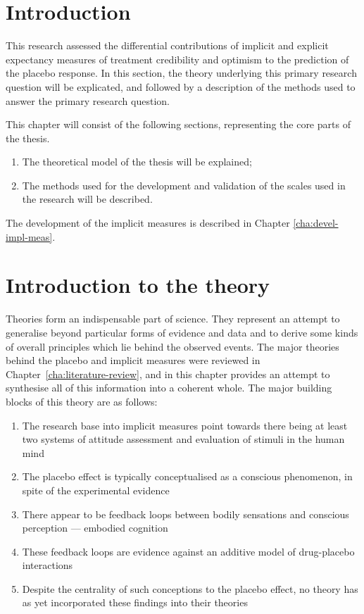
\section{Introduction}

This research assessed the differential contributions of implicit and explicit expectancy measures of treatment credibility and optimism to the prediction of the placebo response. 
In this section, the theory underlying this primary research question will be explicated, and followed by a description of the methods used to answer the primary research question. 


This chapter will consist of the following sections, representing the core parts of the thesis.

\begin{enumerate}
\item The theoretical model of the thesis will be explained;
\item The methods used for the development and validation of the scales used in the research will be described.
\end{enumerate}

The development of the implicit measures is described in Chapter \ref{cha:devel-impl-meas}. 

\section{Introduction to the theory}

Theories form an indispensable part of science. They represent an attempt to generalise beyond particular forms of evidence and data and to derive some kinds of overall principles which lie behind the observed events. The major theories behind the placebo and implicit measures were reviewed in  Chapter~\ref{cha:literature-review}, and in this chapter provides  an attempt to synthesise all of this information into a coherent whole. The major building blocks of this theory are as follows:
\begin{enumerate}
\item The research base into implicit measures point towards there being at least two systems of attitude assessment and evaluation of stimuli in the human mind%
\item The placebo effect is typically conceptualised as a conscious phenomenon, in spite of the experimental evidence
\item There appear to be feedback loops between bodily sensations and conscious perception --- embodied cognition
\item These feedback loops are evidence against an additive model of drug-placebo interactions
\item Despite the centrality of such conceptions to the placebo effect, no theory has as yet incorporated these findings into their theories
\end{enumerate}

